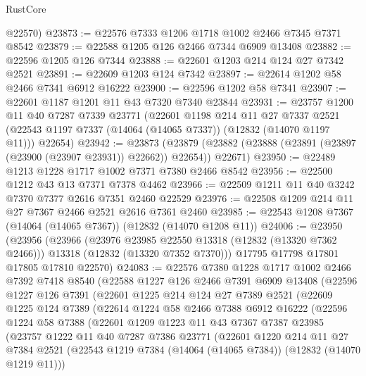 \begin{lexlean}{RustCore}
\begin{coremodule}
      @22570)
@23873 := @22576 @7333 @1206 @1718 @1002 @2466 @7345 @7371 @8542
@23879 := @22588 @1205 @126 @2466 @7344 @6909 @13408
@23882 := @22596 @1205 @126 @7344
@23888 := @22601 @1203 @214 @124 @27 @7342 @2521
@23891 := @22609 @1203 @124 @7342
@23897 := @22614 @1202 @58 @2466 @7341 @6912 @16222
@23900 := @22596 @1202 @58 @7341
@23907 := @22601 @1187 @1201 @11 @43 @7320 @7340 @23844
@23931 := @23757
    @1200
    @11
    @40
    @7287
    @7339
    @23771
    (@22601
      @1198
      @214
      @11
      @27
      @7337
      @2521
      (@22543 @1197 @7337 (@14064 (@14065 @7337)) (@12832 (@14070 @1197 @11)))
      @22654)
@23942 := @23873
    (@23879 (@23882 (@23888 (@23891 (@23897 (@23900 (@23907 @23931)) @22662)) @22654)) @22671)
@23950 := @22489 @1213 @1228 @1717 @1002 @7371 @7380 @2466 @8542
@23956 := @22500 @1212 @43 @13 @7371 @7378 @4462
@23966 := @22509 @1211 @11 @40 @3242 @7370 @7377 @2616 @7351 @2460 @22529
@23976 := @22508 @1209 @214 @11 @27 @7367 @2466 @2521 @2616 @7361 @2460
@23985 := @22543 @1208 @7367 (@14064 (@14065 @7367)) (@12832 (@14070 @1208 @11))
@24006 := @23950
    (@23956
      (@23966
        (@23976 @23985 @22550 @13318 (@12832 (@13320 @7362 @2466)))
        @13318
        (@12832 (@13320 @7352 @7370)))
      @17795
      @17798
      @17801
      @17805
      @17810
      @22570)
@24083 := @22576
    @7380
    @1228
    @1717
    @1002
    @2466
    @7392
    @7418
    @8540
    (@22588
      @1227
      @126
      @2466
      @7391
      @6909
      @13408
      (@22596
        @1227
        @126
        @7391
        (@22601
          @1225
          @214
          @124
          @27
          @7389
          @2521
          (@22609
            @1225
            @124
            @7389
            (@22614
              @1224
              @58
              @2466
              @7388
              @6912
              @16222
              (@22596
                @1224
                @58
                @7388
                (@22601
                  @1209
                  @1223
                  @11
                  @43
                  @7367
                  @7387
                  @23985
                  (@23757
                    @1222
                    @11
                    @40
                    @7287
                    @7386
                    @23771
                    (@22601
                      @1220
                      @214
                      @11
                      @27
                      @7384
                      @2521
                      (@22543 @1219 @7384 (@14064 (@14065 @7384)) (@12832 (@14070 @1219 @11)))

\end{coremodule}
\end{lexlean}
